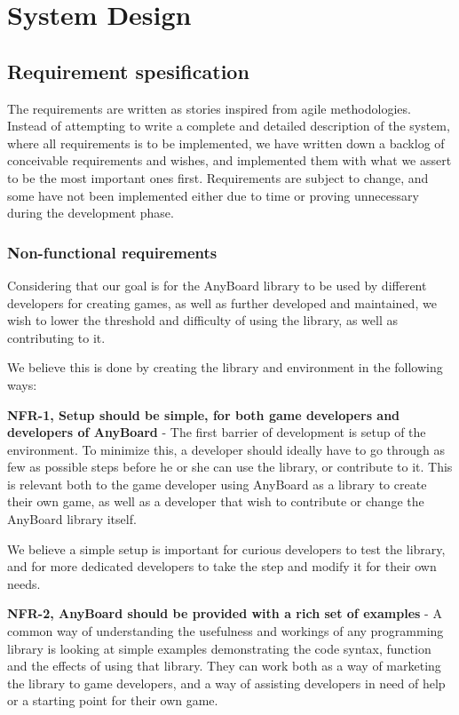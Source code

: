 \chapter{System Design}

\section{Requirement spesification} \label{sec:requirements}
The requirements are written as stories inspired from agile methodologies. Instead of attempting to write a complete and detailed description of the system, where all requirements is to be implemented, we have written down a backlog of conceivable requirements and wishes, and implemented them with what we assert to be the most important ones first. Requirements are subject to change, and some have not been implemented either due to time or proving unnecessary during the development phase.

\subsection{Non-functional requirements}
Considering that our goal is for the AnyBoard library to be used by different developers for creating games, as well as further developed and maintained, we wish to lower the threshold and difficulty of using the library, as well as contributing to it.

We believe this is done by creating the library and environment in the following ways:

\textbf{NFR-1, Setup should be simple, for both game developers and developers of AnyBoard} - The first barrier of development is setup of the environment. To minimize this, a developer should ideally have to go through as few as possible steps before he or she can use the library, or contribute to it. This is relevant both to the game developer using AnyBoard as a library to create their own game, as well as a developer that wish to contribute or change the AnyBoard library itself.

We believe a simple setup is important for curious developers to test the library, and for more dedicated developers to take the step and modify it for their own needs.

\textbf{NFR-2, AnyBoard should be provided with a rich set of examples} - A common way of understanding the usefulness and workings of any programming library is looking at simple examples demonstrating the code syntax, function and the effects of using that library. They can work both as a way of marketing the library to game developers, and a way of assisting developers in need of help or a starting point for their own game.

